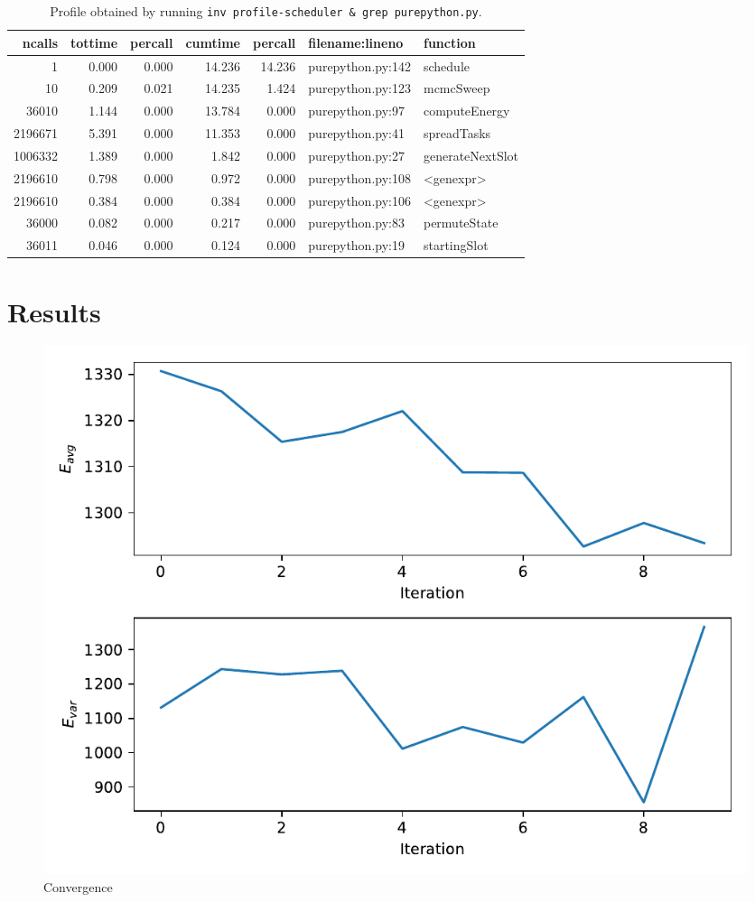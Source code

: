\documentclass{prettytex/ox/mmsc-special-topic}
\begin{document}
  \begin{table}[H]
    \centering
    \caption{Profile obtained by running \texttt{inv profile-scheduler & grep purepython.py}.}
    \begin{tabular}{rrrrrll}
      \hline
      ncalls  & tottime & percall & cumtime & percall & filename:lineno   & function         \\
      \hline
      1       & 0.000   & 0.000   & 14.236  & 14.236  & purepython.py:142 & schedule         \\
      10      & 0.209   & 0.021   & 14.235  & 1.424   & purepython.py:123 & mcmcSweep        \\
      36010   & 1.144   & 0.000   & 13.784  & 0.000   & purepython.py:97  & computeEnergy    \\
      2196671 & 5.391   & 0.000   & 11.353  & 0.000   & purepython.py:41  & spreadTasks      \\
      1006332 & 1.389   & 0.000   & 1.842   & 0.000   & purepython.py:27  & generateNextSlot \\
      2196610 & 0.798   & 0.000   & 0.972   & 0.000   & purepython.py:108 & <genexpr>        \\
      2196610 & 0.384   & 0.000   & 0.384   & 0.000   & purepython.py:106 & <genexpr>        \\
      36000   & 0.082   & 0.000   & 0.217   & 0.000   & purepython.py:83  & permuteState     \\
      36011   & 0.046   & 0.000   & 0.124   & 0.000   & purepython.py:19  & startingSlot     \\
    \end{tabular}
  \end{table}

  \section{Results}
  \begin{figure}[H]
    \centering
    \includegraphics[width=0.8\linewidth]{results/convergence.pdf}
    \caption{Convergence}
  \end{figure}
\end{document}
